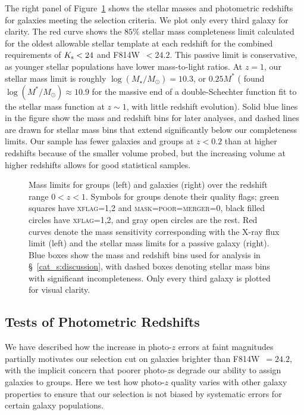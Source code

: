 The right panel of Figure~\ref{cat_fig:mass_limits} shows the stellar
masses and photometric redshifts for galaxies meeting the selection criteria. We
plot only every third galaxy for clarity. The red curve shows the
$85\%$ stellar mass completeness limit calculated for the oldest
allowable stellar template at each redshift for the combined
requirements of $K_{\rm s}<24$ and F814W~$<24.2$. This passive limit
is conservative, as younger stellar populations have lower
mass-to-light ratios. At $z=1$, our stellar mass limit is roughly 
$\log(M_{\star}/M_{\odot})=10.3$, or $0.25 M^{*}$ (\citealt{Drory2009} found
$\log(M^{*}/M_{\odot}) \approx 10.9$ for the massive end of a
double-Schechter function fit to the stellar mass function at $z \sim
1$, with little redshift evolution). Solid 
blue lines in the figure show the mass and redshift bins for later
analyses, and dashed lines are drawn for stellar mass bins that extend
significantly below
our completeness limits. Our sample has fewer galaxies and groups at
$z<0.2$ than at higher redshifts because of the smaller volume probed,
but the increasing volume at higher redshifts allows for good
statistical samples.


\begin{figure}
\caption{Mass limits for groups (left) and galaxies (right) over the
  redshift range $0<z<1$. Symbols for groups denote their quality
  flags; green squares have \textsc{xflag}=1,2 and
  \textsc{mask}=\textsc{poor}=\textsc{merger}=0, black filled circles have
  \textsc{xflag}=1,2, and gray open circles are the rest. Red curves
  denote the mass sensitivity corresponding with the X-ray flux limit
  (left) and the stellar mass limits for a passive galaxy
  (right). Blue boxes show the mass and redshift bins used for analysis in
  \S~\ref{cat_s:discussion}, with dashed boxes denoting stellar mass bins with
  significant incompleteness. Only every third galaxy is plotted for visual clarity.}
\label{cat_fig:mass_limits}
\end{figure}

\subsection{Tests of Photometric Redshifts}
\label{cat_s:photoz_tests}

We have described how the increase in photo-$z$ errors at faint magnitudes
partially motivates our selection cut on galaxies brighter than
F814W~$=24.2$, with the implicit concern that poorer photo-$z$s degrade
our ability to assign galaxies to groups. Here we test how photo-$z$
quality varies with other galaxy properties to ensure that our
selection is not biased by systematic errors for certain galaxy populations.

